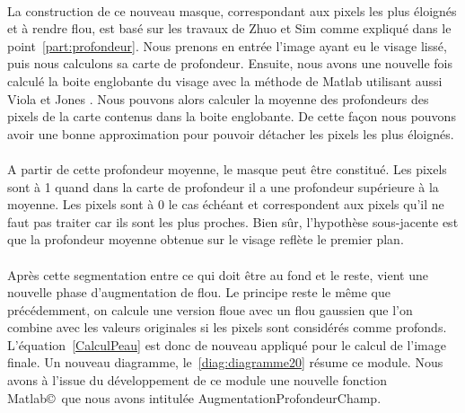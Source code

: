 \documentclass[11pt, french,screen]{report-rd-info}
\begin{document}
\paragraph*{}
La construction de ce nouveau masque, correspondant aux pixels les plus éloignés et à rendre flou, est basé sur les travaux de Zhuo et Sim \cite{Zhuo2011} comme expliqué dans le point~\ref{part:profondeur}.
Nous prenons en entrée l'image ayant eu le visage lissé, puis nous calculons sa carte de profondeur. Ensuite, nous avons une nouvelle fois calculé la boite englobante du visage avec la méthode de Matlab utilisant aussi Viola et Jones \cite{Viola2004}. Nous pouvons alors calculer la moyenne des profondeurs des pixels de la carte contenus dans la boite englobante. De cette façon nous pouvons avoir une bonne approximation pour pouvoir détacher les pixels les plus éloignés. 

\paragraph*{}
A partir de cette profondeur moyenne, le masque peut être constitué. Les pixels sont à 1 quand dans la carte de profondeur il a une profondeur supérieure à la moyenne. Les pixels sont à 0 le cas échéant et correspondent aux pixels qu'il ne faut pas traiter car ils sont les plus proches. Bien sûr, l'hypothèse sous-jacente est que la profondeur moyenne obtenue sur le visage reflète le premier plan. 
 
\paragraph*{}
Après cette segmentation entre ce qui doit être au fond et le reste, vient une nouvelle phase d'augmentation de flou. Le principe reste le même que précédemment, on calcule une version floue avec un flou gaussien que
l'on combine avec les valeurs originales si les pixels sont considérés comme profonds. L'équation~\ref{CalculPeau} est donc de nouveau appliqué pour le calcul de l'image finale. Un nouveau diagramme, le~\ref{diag:diagramme20} résume ce module. Nous avons à l'issue du développement de ce module une nouvelle fonction Matlab\copyright~que nous avons intitulée AugmentationProfondeurChamp.
\end{document}
